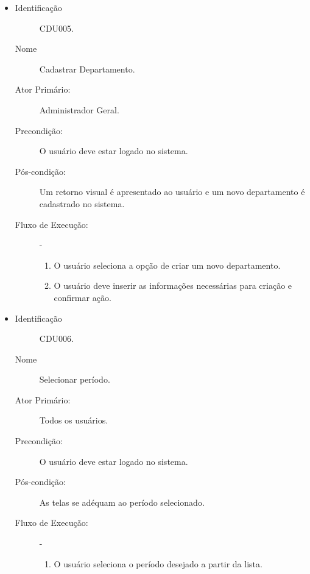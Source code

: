 \begin{itemize}
    \vspace{10pt}

    \item 
        \begin{description}
            \item[Identificação] CDU005.
            \item[Nome] Cadastrar Departamento.
            \item[Ator Primário:] Administrador Geral.
            \item[Precondição:] O usuário deve estar logado no sistema. 
            \item[Pós-condição:] Um retorno visual é apresentado ao usuário e um novo departamento é cadastrado no sistema.
            \item[Fluxo de Execução:] -
                \begin{enumerate}
                    \item O usuário seleciona a opção de criar um novo departamento.
                    \item O usuário deve inserir as informações necessárias para criação e confirmar ação.
                \end{enumerate}
        \end{description}

    \item 
        \begin{description}
            \item[Identificação] CDU006.
            \item[Nome] Selecionar período.
            \item[Ator Primário:] Todos os usuários.
            \item[Precondição:] O usuário deve estar logado no sistema. 
            \item[Pós-condição:] As telas se adéquam ao período selecionado.
            \item[Fluxo de Execução:] -
                \begin{enumerate}
                    \item O usuário seleciona o período desejado a partir da lista.
                \end{enumerate}
        \end{description}

    \vspace{10pt}
    

\end{itemize}
